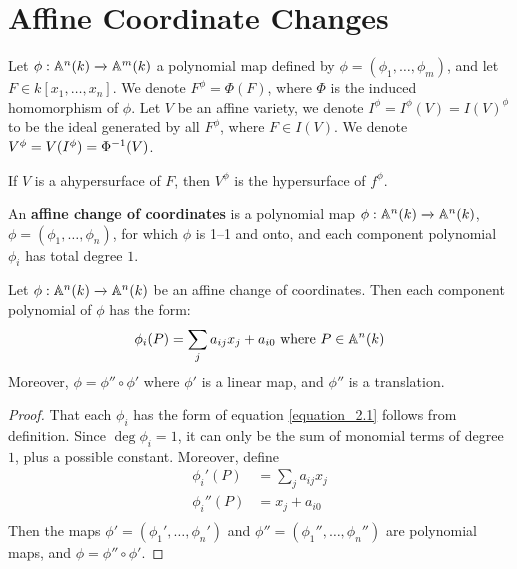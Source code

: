 \section{Affine Coordinate Changes}

Let $\phi:\mathbb{A}^n(k) \xrightarrow{} \mathbb{A}^m(k)$ a polynomial map defined by
$\phi=(\phi_1, \dots, \phi_m)$, and let $F \in k[x_1, \dots, x_n]$. We denote
$F^\phi=\Phi(F)$, where $\Phi$ is the induced homomorphism of $\phi$. Let $V$ be
an affine variety, we denote $I^\phi=I^\phi(V)=I(V)^\phi$ to be the ideal
generated by all $F^\phi$, where  $F \in I(V)$. We denote
$V^\phi=V(I^\phi)=\Phi^{-1}(V)$.

\begin{example}\label{example_2.1}
  If $V$ is a ahypersurface of  $F$, then  $V^\phi$ is the hypersurface of
  $f^\phi$.
\end{example}

\begin{definition}
  An \textbf{affine change of coordinates} is a polynomial map
  $\phi:\mathbb{A}^n(k) \xrightarrow{} \mathbb{A}^n(k)$, $\phi=(\phi_1, \dots, \phi_n)$, for
  which $\phi$ is 1--1 and onto, and each component polynomial $\phi_i$ has
  total degree  $1$.
\end{definition}

\begin{lemma}\label{lemma_2.2.1}
  Let $\phi:\mathbb{A}^n(k) \xrightarrow{} \mathbb{A}^n(k)$ be an affine change of coordinates.
  Then each component polynomial of $\phi$ has the form:
  \begin{equation}\label{equation_2.1}
    \phi_i(P)=\sum_{j}{a_{ij}x_j}+a_{i0} \text{ where } P \in \mathbb{A}^n(k)
  \end{equation}
  Moreover, $\phi=\phi'' \circ \phi'$ where $\phi'$ is a linear map, and
  $\phi''$ is a translation.
\end{lemma}
\begin{proof}
  That each $\phi_i$ has the form of equation \ref{equation_2.1} follows from
  definition. Since $\deg{\phi_i}=1$, it can only be the sum of monomial terms
  of degree $1$, plus a possible constant. Moreover, define
  \begin{align*}
    \phi_i'(P)  &=  \sum_{j}{a_{ij}x_j} \\
    \phi_i''(P) &=  x_j+a_{i0} \\
  \end{align*}
  Then the maps $\phi'=(\phi_1', \dots, \phi_n')$ and $\phi''=(\phi_1'', \dots,
  \phi_n'')$ are polynomial maps, and $\phi=\phi'' \circ \phi'$.
\end{proof}

